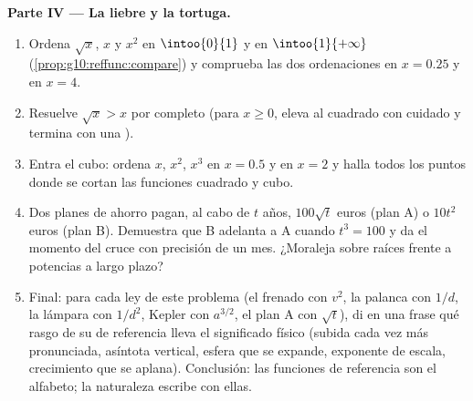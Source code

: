 \begin{problem}
\medskip
\noindent\textbf{Parte IV --- La liebre y la tortuga.}
\begin{enumerate}[resume]
  \item Ordena $\sqrt x$, $x$ y $x^2$ en $\intoo{0}{1}$ y en
        $\intoo{1}{+\infty}$ (\cref{prop:g10:reffunc:compare}) y comprueba
        las dos ordenaciones en $x = 0.25$ y en $x = 4$.
  \item Resuelve $\sqrt x > x$ por completo (para $x \geq 0$, eleva al
        cuadrado con cuidado y termina con una ).
  \item Entra el cubo: ordena $x$, $x^2$, $x^3$ en $x = 0.5$ y en $x = 2$
        y halla todos los puntos donde se cortan las funciones cuadrado y
        cubo.
  \item Dos planes de ahorro pagan, al cabo de $t$ años, $100\sqrt t$
        euros (plan A) o $10 t^2$ euros (plan B). Demuestra que B adelanta
        a A cuando $t^3 = 100$ y da el momento del cruce con precisión de
        un mes. ¿Moraleja sobre raíces frente a potencias a largo plazo?
  \item Final: para cada ley de este problema (el frenado con $v^2$, la
        palanca con $1/d$, la lámpara con $1/d^2$, Kepler con $a^{3/2}$,
        el plan A con $\sqrt t$), di en una frase qué rasgo de su 
        de referencia lleva el significado físico (subida cada vez más
        pronunciada, asíntota vertical, esfera que se expande, exponente
        de escala, crecimiento que se aplana). Conclusión: las funciones
        de referencia son el alfabeto; la naturaleza escribe con ellas.
\end{enumerate}
\end{problem}
